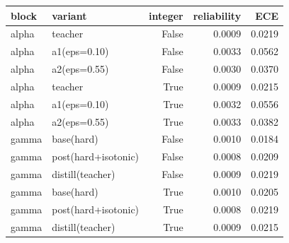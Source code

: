 \begin{tabular}{llrrr}
\toprule
block & variant & integer & reliability & ECE \\
\midrule
alpha & teacher & False & 0.0009 & 0.0219 \\
alpha & a1(eps=0.10) & False & 0.0033 & 0.0562 \\
alpha & a2(eps=0.55) & False & 0.0030 & 0.0370 \\
alpha & teacher & True & 0.0009 & 0.0215 \\
alpha & a1(eps=0.10) & True & 0.0032 & 0.0556 \\
alpha & a2(eps=0.55) & True & 0.0033 & 0.0382 \\
gamma & base(hard) & False & 0.0010 & 0.0184 \\
gamma & post(hard+isotonic) & False & 0.0008 & 0.0209 \\
gamma & distill(teacher) & False & 0.0009 & 0.0219 \\
gamma & base(hard) & True & 0.0010 & 0.0205 \\
gamma & post(hard+isotonic) & True & 0.0008 & 0.0219 \\
gamma & distill(teacher) & True & 0.0009 & 0.0215 \\
\bottomrule
\end{tabular}
